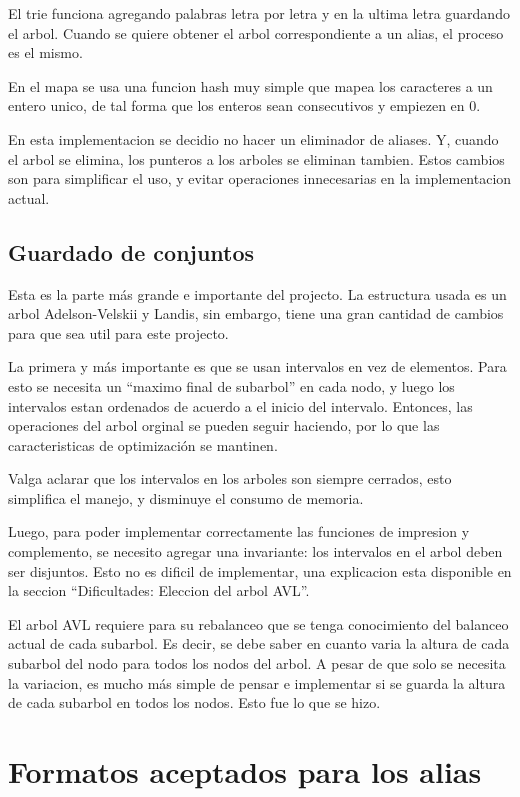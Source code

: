 \documentclass{article}
\begin{document}
	El trie funciona agregando palabras letra por letra y en la ultima letra guardando el arbol. Cuando se quiere obtener el arbol correspondiente a un alias, el proceso es el mismo. 
	
	En el mapa se usa una funcion hash muy simple que mapea los caracteres a un entero unico, de tal forma que los enteros sean consecutivos y empiezen en 0.
	
	En esta implementacion se decidio no hacer un eliminador de aliases. Y, cuando el arbol se elimina, los punteros a los arboles se eliminan tambien. Estos cambios son para simplificar el uso, y evitar operaciones innecesarias en la implementacion actual. 

	\subsection*{Guardado de conjuntos}
	
	Esta es la parte más grande e importante del projecto. La estructura usada es un arbol Adelson-Velskii y Landis, sin embargo, tiene una gran cantidad de cambios para que sea util para este projecto.
	
	La primera y más importante es que se usan intervalos en vez de elementos. Para esto se necesita un ``maximo final de subarbol'' en cada nodo, y luego los intervalos estan ordenados de acuerdo a el inicio del intervalo. Entonces, las operaciones del arbol orginal se pueden seguir haciendo, por lo que las caracteristicas de optimización se mantinen.
	
	Valga aclarar que los intervalos en los arboles son siempre cerrados, esto simplifica el manejo, y disminuye el consumo de memoria.
	
	Luego, para poder implementar correctamente las funciones de impresion y complemento, se necesito agregar una invariante: los intervalos en el arbol deben ser disjuntos. Esto no es dificil de implementar, una explicacion esta disponible en la seccion ``Dificultades: Eleccion del arbol AVL''.
	
	El arbol AVL requiere para su rebalanceo que se tenga conocimiento del balanceo actual de cada subarbol. Es decir, se debe saber en cuanto varia la altura de cada subarbol del nodo para todos los nodos del arbol. A pesar de que solo se necesita la variacion, es mucho más simple de pensar e implementar si se guarda la altura de cada subarbol en todos los nodos. Esto fue lo que se hizo.
	
	\section*{Formatos aceptados para los alias}
	
\end{document}
